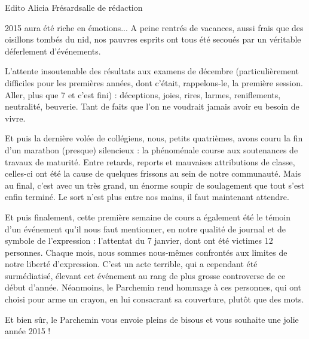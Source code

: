 \begin{spacing}{.9}
\vspace*{-1.1cm}
\begin{article}{Edito}
{Alicia Frésard}{salle de rédaction}
\begin{spacing}{.96}
 2015 aura été riche en émotions... A peine rentrés de vacances, aussi frais que des oisillons tombés du nid, nos pauvres esprits ont tous été secoués par un véritable déferlement d’événements. 

L'attente insoutenable des résultats aux examens de décembre (particulièrement difficiles pour les premières années, dont c'était, rappelons-le, la première session. Aller, plus que 7 et c'est fini) : déceptions, joies, rires, larmes, reniflements, neutralité, beuverie. Tant de faits que l'on ne voudrait jamais avoir eu besoin de vivre.\end{spacing}

Et puis la dernière volée de collégiens, nous, petits quatrièmes, avons couru la fin d'un marathon (presque) silencieux : la phénoménale course aux soutenances de travaux de maturité. Entre retards, reports et mauvaises attributions de classe, celles-ci ont été la cause de quelques frissons au sein de notre communauté. Mais au final, c'est avec un très grand, un énorme soupir de soulagement que tout s'est enfin terminé. Le sort n'est plus entre nos mains, il faut maintenant attendre.

Et puis finalement, cette première semaine de cours a également été le témoin d'un événement qu'il nous faut mentionner, en notre qualité de journal et de symbole de l'expression : l’attentat du 7 janvier, dont ont été victimes 12 personnes. Chaque mois, nous sommes nous-mêmes confrontés aux limites de notre liberté d'expression. C'est un acte terrible, qui a cependant été surmédiatisé, élevant cet événement au rang de plus grosse controverse de ce début d'année. Néanmoins, le Parchemin rend hommage à ces personnes, qui ont choisi pour arme un crayon, en lui consacrant sa couverture, plutôt que des mots.

Et bien sûr, le Parchemin vous envoie pleins de bisous et vous souhaite une jolie année 2015 !
\end{article}
\end{spacing}

\restoregeometry
\newpage



